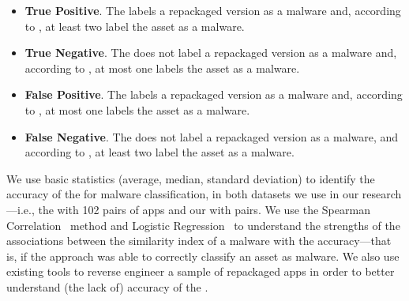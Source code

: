 \begin{itemize}
\item {\bf True Positive}. The \mas labels a repackaged version as a malware and, according to
  \vt, at least two \ses label the asset as a malware.
  
\item {\bf True Negative}. The \mas does not label a repackaged version as a malware and,
  according to \vt, at most one \se labels the asset as a malware. 

\item {\bf False Positive}. The \mas labels a repackaged version as a malware and, according to
  \vt, at most one \se labels the asset as a malware.

\item {\bf False Negative}. The \mas does not label a repackaged version as a malware, and
  according to \vt, at least two \ses label the asset as a malware.
\end{itemize}

We use basic statistics (average, median, standard deviation) to identify the
accuracy of the \mas for malware classification, in both
datasets we use in our research---i.e., the \sds
with 102 pairs of apps and our \cds with
\apps pairs. We use the Spearman Correlation~\cite{spearman-correlation} method and
Logistic Regression~\cite{statistical-learning} to understand the strengths of
the associations between the similarity index of a
malware with the \mas accuracy---that is,
if the approach was able to correctly classify an asset as malware. We also use existing tools to reverse engineer a sample of repackaged
apps in order to better understand (the lack of) accuracy
of the \mas.







